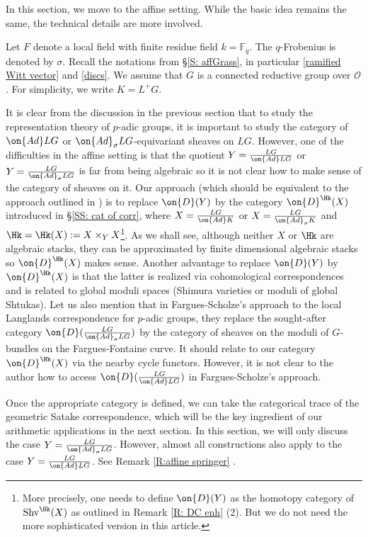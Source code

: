 \documentclass[11pt]{amsart}
\theoremstyle{definition}
\theoremstyle{definition}
\theoremstyle{definition}
\numberwithin{equation}{subsection}
\newcommand{\bF}{{\mathbb F}}
\newcommand{\mO}{{\mathcal O}}
\newcommand{\Ad}{{\on{Ad}}}
\newcommand{\Shv}{\mathrm{Shv}}
\begin{document}
In this section, we move to the affine setting. While the basic idea remains the same, the technical details are more involved.

Let $F$ denote a local field with finite residue field $k=\bF_q$. The $q$-Frobenius is denoted by $\sigma$. 
Recall the notations from \S \ref{S: affGrass}, in particular \eqref{ramified Witt vector} and \eqref{discs}. We assume that $G$ is a connected reductive group over $\mO$. For simplicity, we write $K=L^+G$.

It is clear from the discussion in the previous section that to study the representation theory of $p$-adic groups, it is important to study the category of $\Ad LG$ or $\Ad_\sigma LG$-equivariant sheaves on $LG$. However, one of the difficulties in the affine setting is that the quotient $Y=\frac{LG}{\Ad LG}$ or $Y=\frac{LG}{\Ad_\sigma LG}$ is far from being algebraic so it is not clear how to make sense of the category of sheaves on it. Our approach (which should be equivalent to the approach outlined in \cite{Ga}) is to replace $\on{D}(Y)$ by the category $\on{D}^\Hk(X)$ introduced in \S \ref{SS: cat of corr}, where $X=\frac{LG}{\Ad K}$ or $X=\frac{LG}{\Ad_\sigma  K}$ and $\Hk=\Hk(X):=X\times_YX$\footnote{More precisely, one needs to define $\on{D}(Y)$ as the homotopy category of $\Shv^{\Hk}(X)$ as outlined in Remark \ref{R: DC enh} (2). But we do not need the more sophisticated version in this article.}.  As we shall see, although neither $X$ or $\Hk$ are algebraic stacks, they can be approximated by finite dimensional algebraic stacks so $\on{D}^{\Hk}(X)$ makes sense. Another advantage to replace $\on{D}(Y)$ by $\on{D}^\Hk(X)$ is that the latter is realized via cohomological correspondences and is related to global moduli spaces (Shimura varieties or moduli of global Shtukas). Let us also mention that in Fargues-Scholze's approach to the local Langlands correspondence for $p$-adic groups, they replace the sought-after category $\on{D}(\frac{LG}{\Ad_\sigma LG})$ by the category of sheaves on the moduli of $G$-bundles on the Fargues-Fontaine curve. It should relate to our category $\on{D}^\Hk(X)$ via the nearby cycle functors. However, it is not clear to the author how to access $\on{D}(\frac{LG}{\Ad LG})$ in Fargues-Scholze's approach.


Once the appropriate category is defined, we can take the categorical trace of the geometric Satake correspondence, which will be the key ingredient of our arithmetic applications in the next section. In this section, we will only discuss the case $Y=\frac{LG}{\Ad_\sigma LG}$. However, almost all constructions also apply to the case $Y=\frac{LG}{\Ad LG}$. See Remark \ref{R:affine springer} .
\end{document}
